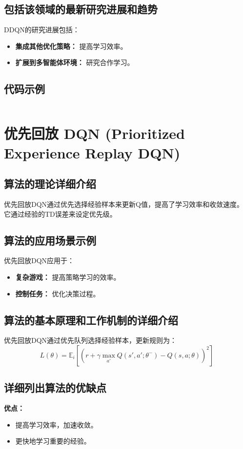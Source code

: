 \subsection*{包括该领域的最新研究进展和趋势}
DDQN的研究进展包括：
\begin{itemize}
    \item \textbf{集成其他优化策略：} 提高学习效率。
    \item \textbf{扩展到多智能体环境：} 研究合作学习。
\end{itemize}
\subsection*{代码示例}
\begin{lstlisting}

\end{lstlisting}


\section{优先回放 DQN (Prioritized Experience Replay DQN)}
\subsection*{算法的理论详细介绍}
优先回放DQN通过优先选择经验样本来更新Q值，提高了学习效率和收敛速度。它通过经验的TD误差来设定优先级。

\subsection*{算法的应用场景示例}
优先回放DQN应用于：
\begin{itemize}
    \item \textbf{复杂游戏：} 提高策略学习的效率。
    \item \textbf{控制任务：} 优化决策过程。
\end{itemize}

\subsection*{算法的基本原理和工作机制的详细介绍}
优先回放DQN通过优先队列选择经验样本，更新规则为：
\[
    L(\theta) = \mathbb{E}_i \left[ \left( r + \gamma \max_{a'} Q(s', a'; \theta^-) - Q(s, a; \theta) \right)^2 \right]
\]

\subsection*{详细列出算法的优缺点}
\textbf{优点：}
\begin{itemize}
    \item 提高学习效率，加速收敛。
    \item 更快地学习重要的经验。
\end{itemize}

